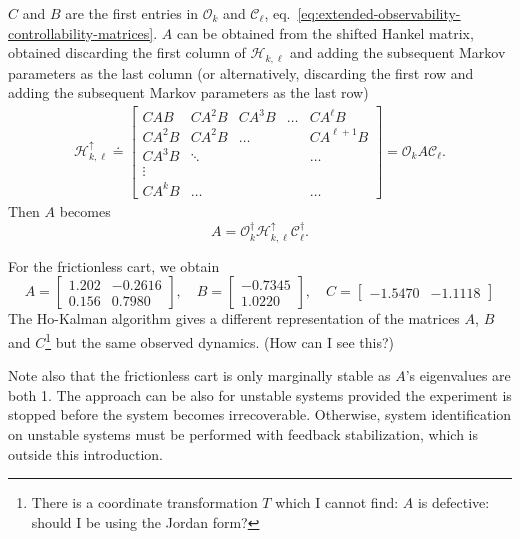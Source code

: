 $C$ and $B$ are the first entries in $\mathcal{O}_k$ and $\mathcal{C}_\ell$, eq.~\eqref{eq:extended-observability-controllability-matrices}. $A$ can be obtained from the shifted Hankel matrix, obtained discarding the first column of $\mathcal{H}_{k,\ell}$ and adding the subsequent Markov parameters as the last column (or alternatively, discarding the first row and adding the subsequent Markov parameters as the last row)
\begin{align*}
  \mathcal{H}_{k,\ell}^\uparrow \doteq
  \begin{bmatrix}
    CAB & CA^2B & CA^3 B & \ldots & CA^\ell B \\
    CA^2B & CA^2B & \ldots & & CA^{\ell+1}B \\
    CA^3B & \ddots & & & \ldots \\
    \vdots \\
    CA^kB & \ldots & & & \ldots
  \end{bmatrix} = \mathcal{O}_k A \mathcal{C}_\ell.
\end{align*}
Then $A$ becomes
\begin{equation*}
  A = \mathcal{O}_k^\dagger\mathcal{H}_{k,\ell}^\uparrow \mathcal{C}_\ell^\dagger.
\end{equation*}

For the frictionless cart, we obtain
\begin{equation*}
  A =
  \begin{bmatrix}
    1.202 & -0.2616 \\
    0.156 &  0.7980
  \end{bmatrix},\quad B =
  \begin{bmatrix}
    -0.7345 \\
    1.0220
  \end{bmatrix},\quad C =
  \begin{bmatrix}
    -1.5470 & -1.1118
  \end{bmatrix}
\end{equation*}
The Ho-Kalman algorithm gives a different representation of the matrices $A$, $B$ and $C$\footnote{There is a coordinate transformation $T$ which I cannot find: $A$ is defective: should I be using the Jordan form?} but the same observed dynamics. (How can I see this?)

Note also that the frictionless cart is only marginally stable as $A$'s eigenvalues are both 1. The approach can be also for unstable systems provided the experiment is stopped before the system becomes irrecoverable. Otherwise, system identification on unstable systems must be performed with feedback stabilization, which is outside this introduction.

